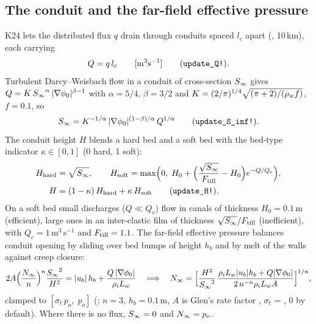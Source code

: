 \subsection{The conduit and the far-field effective pressure}
K24 lets the distributed flux $q$ drain through conduits spaced $l_c$ apart (, 10\,km), each
carrying
\begin{equation}
Q = q\,l_c \qquad[\text{m}^3\text{s}^{-1}] \qquad(\texttt{update\_Q!}).
\end{equation}
Turbulent Darcy--Weisbach flow in a conduit of cross-section ${S_\infty}$ gives $Q = K\,{S_\infty}^{\alpha}\,|\nabla\phi_0|^{\beta-1}$
with $\alpha = 5/4$, $\beta = 3/2$ and $K = (2/\pi)^{1/4}\sqrt{(\pi+2)/({\rho_w} f)}$, $f = 0.1$, so
\begin{equation}\label{eq:Sinf}
{S_\infty} = K^{-1/\alpha}\,|\nabla\phi_0|^{(1-\beta)/\alpha}\,Q^{1/\alpha} \qquad(\texttt{update\_S\_inf!}).
\end{equation}
The conduit height $H$ blends a hard bed and a soft bed with the bed-type indicator $\kappa\in[0,1]$
(0 hard, 1 soft):
\begin{align}
H_{\rm hard} &= \sqrt{{S_\infty}}, \qquad
H_{\rm soft} = \max\Bigl(0,\; H_0 + \Bigl(\frac{\sqrt{{S_\infty}}}{F_{\rm till}} - H_0\Bigr)e^{-Q/Q_c}\Bigr), \nonumber\\
H &= (1-\kappa)\,H_{\rm hard} + \kappa\,H_{\rm soft} \qquad(\texttt{update\_H!}).\label{eq:H}
\end{align}
On a soft bed small discharges ($Q\ll Q_c$) flow in canals of thickness $H_0 = 0.1$\,m (efficient), large ones in
an inter-clastic film of thickness $\sqrt{{S_\infty}}/F_{\rm till}$ (inefficient), with $Q_c = 1$\,m$^3$\,s$^{-1}$ and
$F_{\rm till} = 1.1$. The far-field effective pressure balances conduit opening by sliding over bed bumps of height
$h_b$ and by melt of the walls against creep closure:
\begin{equation}\label{eq:Ninf}
2A\Bigl(\frac{{N_\infty}}{n}\Bigr)^{n}\frac{{S_\infty}^2}{H^2}
= |u_b|\,h_b + \frac{Q\,|\nabla\phi_0|}{{\rho_i} L_w}
\quad\Longrightarrow\quad
{N_\infty} = \Bigl[\frac{H^2}{{S_\infty}^2}\,\frac{{\rho_i} L_w |u_b| h_b + Q|\nabla\phi_0|}{2\,n^{-n}{\rho_i} L_w A}\Bigr]^{1/n},
\end{equation}
clamped to $[\sigma_t\,p_o,\; p_o]$ (; $n=3$, $h_b = 0.1$\,m, $A$ is Glen's rate factor
, $\sigma_t$ = , 0 by default). Where there is no flux, ${S_\infty} = 0$ and ${N_\infty} = p_o$.

